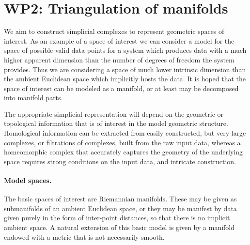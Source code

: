 %

\newcommand{\man}{\mathcal{M}}
\newcommand{\reel}{\mathbb{R}}
\newcommand{\rdee}{\reel^d}
\renewcommand{\pts}{P}
\newcommand{\mesh}{\hat{M}}

\newcommand{\ramsay}[1]{\rred{[[#1]]}}

\section*{WP2: Triangulation of manifolds}

We aim to construct simplicial complexes to represent
geometric spaces of interest. As an example of a space of interest we
can consider a model for the space of possible valid data points for a
system which produces data with a much higher apparent dimension than
the number of degrees of freedom  the system provides. Thus we are
considering a space of much lower intrinsic dimension than the ambient
Euclidean space which implicitly hosts the data. It is hoped that the
space of interest can be modeled as a manifold, or at least may be
decomposed into manifold parts. 

The appropriate simplicial representation will depend on the geometric
or topological information that is of interest in the model geometric
structure. Homological information can be extracted from easily
constructed, but very large complexes, or filtrations of complexes,
built from the raw input data, whereas a homeomorphic complex that
accurately captures the geometry of the underlying space requires
strong conditions on the input data, and intricate construction.


\paragraph{Model spaces.} 
The basic spaces of interest are Riemannian manifolds. These may be
given as submanifolds of an ambient Euclidean space, or they may be
manifest by data given purely in the form of inter-point distances, so
that there is no implicit ambient space.  
A natural extension of this basic model is given by a manifold endowed
with a metric that is not necessarily smooth. 

